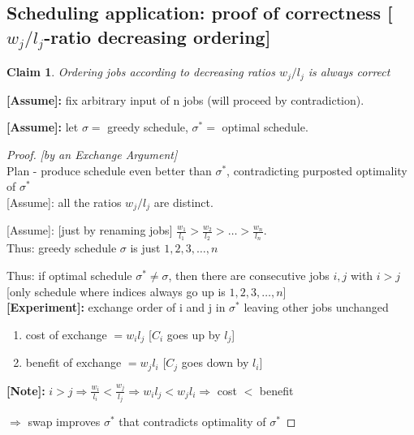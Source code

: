 \documentclass[a4paper,12pt]{article}
\theoremstyle{plain}
\newtheorem{claim}{Claim}
\theoremstyle{definition}
\theoremstyle{remark}
\begin{document}
\subsection{Scheduling application: proof of correctness [$w_j/l_j$-ratio decreasing ordering]}

\begin{claim}Ordering jobs according to decreasing ratios $w_j/l_j$ is always correct\end{claim}

\textbf{[Assume]:} fix arbitrary input of n jobs (will proceed by contradiction).

\textbf{[Assume]:} let $\sigma =$ greedy schedule, $\sigma^* =$ optimal schedule.

\begin{proof}

\textit{[by an Exchange Argument]}
\\

Plan - produce schedule even better than $\sigma^*$, contradicting purposted optimality of $\sigma^*$
\\

[Assume]: all the ratios $w_j/l_j$ are distinct.

[Assume]: [just by renaming jobs] $\frac{w_1}{l_1} > \frac{w_2}{l_2} > \dots > \frac{w_n}{l_n}$.
\\

Thus: greedy schedule $\sigma$ is just $1,2,3,\dots,n$

Thus: if optimal schedule $\sigma^* \neq \sigma$, then there are consecutive jobs $i, j$ with $i > j$ [only schedule where indices always go up is $1,2,3,\dots,n$]
\\

\textbf{[Experiment]:} exchange order of i and j in $\sigma^*$ leaving other jobs unchanged

\begin{enumerate}
\item cost of exchange $= w_il_j$ [$C_i$ goes up by $l_j$]
\item benefit of exchange $= w_jl_i$ [$C_j$ goes down by $l_i$]
\end{enumerate}

\textbf{[Note]:} $i>j \Rightarrow \frac{w_i}{l_i} < \frac{w_j}{l_j} \Rightarrow w_il_j < w_jl_i \Rightarrow$ cost $<$ benefit

$\Rightarrow$ swap improves $\sigma^*$ that contradicts optimality of $\sigma^*$
\end{proof}
\end{document}
